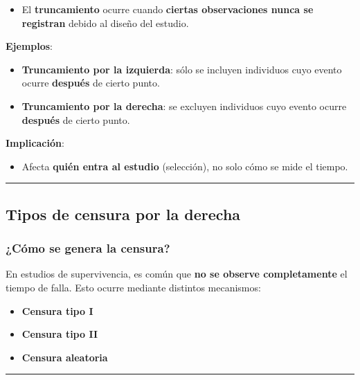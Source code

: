 \documentclass[
  letterpaper,
  DIV=11,
  numbers=noendperiod]{scrartcl}
\providecommand{\tightlist}{%
  \setlength{\itemsep}{0pt}\setlength{\parskip}{0pt}}
\begin{document}
\begin{itemize}
\tightlist
\item
  El \textbf{truncamiento} ocurre cuando \textbf{ciertas observaciones
  nunca se registran} debido al diseño del estudio.
\end{itemize}

\textbf{Ejemplos}:

\begin{itemize}
\tightlist
\item
  \textbf{Truncamiento por la izquierda}: sólo se incluyen individuos
  cuyo evento ocurre \textbf{después} de cierto punto.
\item
  \textbf{Truncamiento por la derecha}: se excluyen individuos cuyo
  evento ocurre \textbf{después} de cierto punto.
\end{itemize}

\textbf{Implicación}:

\begin{itemize}
\tightlist
\item
  Afecta \textbf{quién entra al estudio} (selección), no solo cómo se
  mide el tiempo.
\end{itemize}

\begin{center}\rule{0.5\linewidth}{0.5pt}\end{center}

\subsection{Tipos de censura por la
derecha}\label{tipos-de-censura-por-la-derecha}

\subsubsection{¿Cómo se genera la
censura?}\label{cuxf3mo-se-genera-la-censura}

En estudios de supervivencia, es común que \textbf{no se observe
completamente} el tiempo de falla. Esto ocurre mediante distintos
mecanismos:

\begin{itemize}
\tightlist
\item
  \textbf{Censura tipo I}
\item
  \textbf{Censura tipo II}
\item
  \textbf{Censura aleatoria}
\end{itemize}

\begin{center}\rule{0.5\linewidth}{0.5pt}\end{center}
\end{document}
